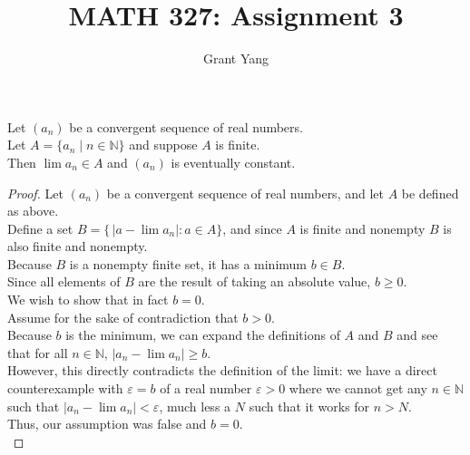 \documentclass{article}
\newenvironment{theorem}[1]{\renewcommand\theinnercustomthm{#1}\innercustomthm}
  {\endinnercustomthm}
\begin{document}
\title{MATH 327: Assignment 3}
\author{Grant Yang}
\maketitle


\begin{theorem}1
    Let $(a_n)$ be a convergent sequence of real numbers. \\
    Let $A = \{a_n \mid n\in \mathbb N\}$ and suppose $A$ is finite. \\
    Then $\lim a_n \in A$ and $(a_n)$ is eventually constant.
\end{theorem}
\begin{proof}
    Let $(a_n)$ be a convergent sequence of real numbers, and let $A$ be defined as above. \\
    Define a set $B = \{\,|a - \lim a_n| : a \in A\}$, and since $A$ is finite and nonempty $B$ is also finite and nonempty. \\
    Because $B$ is a nonempty finite set, it has a minimum $b \in B$. \\
    Since all elements of $B$ are the result of taking an absolute value, $b \ge 0$. \\
    We wish to show that in fact $b = 0$. \\
    Assume for the sake of contradiction that $b > 0$. \\
    Because $b$ is the minimum, we can expand the definitions of $A$ and $B$ and see that for all $n \in \mathbb N$, $|a_n - \lim a_n | \ge b$. \\
    However, this directly contradicts the definition of the limit: we have a direct counterexample with $\varepsilon = b$ of a real number $\varepsilon > 0$ where we cannot get any $n \in \mathbb N$ such that $|a_n - \lim a_n | < \varepsilon$, much less a $N$ such that it works for $n > N$. \\
    Thus, our assumption was false and $b = 0$. \\


\end{proof}
\end{document}
